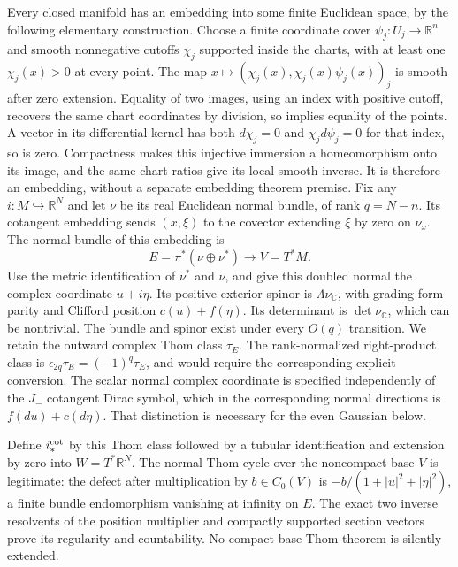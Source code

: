 \documentclass[
  11pt,
]{article}
\begin{document}
Every closed manifold has an embedding into some finite Euclidean space,
by the following elementary construction. Choose a finite coordinate
cover \(\psi_j:U_j\to\mathbb R^n\) and smooth nonnegative cutoffs
\(\chi_j\) supported inside the charts, with at least one
\(\chi_j(x)>0\) at every point. The map
\(x\mapsto(\chi_j(x),\chi_j(x)\psi_j(x))_j\) is smooth after zero
extension. Equality of two images, using an index with positive cutoff,
recovers the same chart coordinates by division, so implies equality of
the points. A vector in its differential kernel has both \(d\chi_j=0\)
and \(\chi_jd\psi_j=0\) for that index, so is zero. Compactness makes
this injective immersion a homeomorphism onto its image, and the same
chart ratios give its local smooth inverse. It is therefore an
embedding, without a separate embedding theorem premise. Fix any
\(i:M\hookrightarrow\mathbb R^N\) and let \(\nu\) be its real Euclidean
normal bundle, of rank \(q=N-n\). Its cotangent embedding sends
\((x,\xi)\) to the covector extending \(\xi\) by zero on \(\nu_x\). The
normal bundle of this embedding is \[
 E=\pi^*(\nu\oplus\nu^*)\longrightarrow V=T^*M.
 \tag{CI.51}
\] Use the metric identification of \(\nu^*\) and \(\nu\), and give this
doubled normal the complex coordinate \(u+i\eta\). Its positive exterior
spinor is \(\Lambda\nu_{\mathbb C}\), with grading form parity and
Clifford position \(c(u)+f(\eta)\). Its determinant is
\(\det\nu_{\mathbb C}\), which can be nontrivial. The bundle and spinor
exist under every \(O(q)\) transition. We retain the outward complex
Thom class \(\tau_E\). The rank-normalized right-product class is
\(\epsilon_{2q}\tau_E=(-1)^q\tau_E\), and would require the
corresponding explicit conversion. The scalar normal complex coordinate
is specified independently of the \(J_-\) cotangent Dirac symbol, which
in the corresponding normal directions is \(f(du)+c(d\eta)\). That
distinction is necessary for the even Gaussian below.

Define \(i_*^{\rm cot}\) by this Thom class followed by a tubular
identification and extension by zero into \(W=T^*\mathbb R^N\). The
normal Thom cycle over the noncompact base \(V\) is legitimate: the
defect after multiplication by \(b\in C_0(V)\) is
\(-b/(1+|u|^2+|\eta|^2)\), a finite bundle endomorphism vanishing at
infinity on \(E\). The exact two inverse resolvents of the position
multiplier and compactly supported section vectors prove its regularity
and countability. No compact-base Thom theorem is silently extended.
\end{document}
